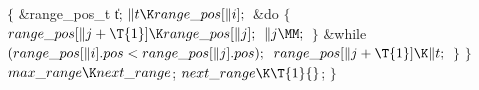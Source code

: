 \1${}\{{}$\5
\&{range\_pos\_t} \|t;\7
${}\|t\K\index{range pos+\\{range\_pos}}\\{range\_pos}[\|i];{}$\6
\&{do}\5
\1${}\{{}$\5
${}\index{range pos+\\{range\_pos}}\\{range\_pos}[\|j+\T{1}]\K\index{range pos+\\{range\_pos}}\\{range\_pos}[\|j];{}$\6
${}\|j\MM;{}$\6
\4${}\}{}$\2\5
\&{while} ${}(\index{range pos+\\{range\_pos}}\\{range\_pos}[\|i].\index{pos+\\{pos}}\\{pos}<\index{range pos+\\{range\_pos}}\\{range\_pos}[\|j].\index{pos+\\{pos}}\\{pos});{}$\6
${}\index{range pos+\\{range\_pos}}\\{range\_pos}[\|j+\T{1}]\K\|t;{}$\6
\4${}\}{}$\2\6
\4${}\}{}$\2\6
${}\index{max range+\\{max\_range}}\\{max\_range}\K\index{next range+\\{next\_range}}\\{next\_range}{}$;\5
${}\index{next range+\\{next\_range}}\\{next\_range}\K\T{1}{}$;\6
\4${}\}{}$\2
\Y
\fi


